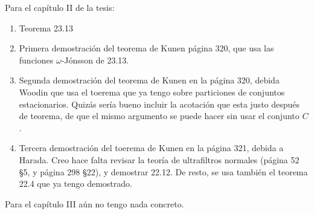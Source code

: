 \documentclass[12pt]{article}
\begin{document}
Para el capítulo II de la tesis:

\begin{enumerate}
    \item Teorema 23.13
    \item Primera demostración del teorema de Kunen página 320, que usa
        las funciones $\omega$-Jónsson de 23.13.
    \item Segunda demostración del teorema de Kunen en la página 320, debida Woodin que usa
        el toerema que ya tengo sobre particiones de conjuntos estacionarios.
        Quizás sería bueno incluir la acotación que esta justo después de teorema,
        de que el mismo argumento se puede hacer sin usar el conjunto $C$.
    \item Tercera demostración del toerema de Kunen en la página 321, debida a Harada.
        Creo hace falta revisar la teoría de ultrafiltros normales (página 52 \S5, y página 298 \S22), y
        demostrar 22.12. De resto, se usa también el teorema 22.4 que ya tengo demostrado.
\end{enumerate}

Para el capítulo III aún no tengo nada concreto.
\end{document}
